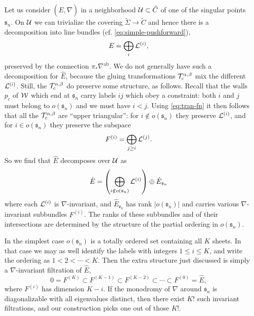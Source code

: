\documentclass[11pt,a4paper]{article}
\def\CL {{\cal L}}
\def\wnet {{\cal W}}
\def\CU{{\cal U}}
\def\CT{{\cal T}}
\def\ab{{\mathrm{ab}}}
\newcommand{\abs}[1]{\lvert#1\rvert}
\def\fs{\mathfrak{s}}
\def\CL {{\cal L}}
\def\wnet {{\cal W}}
\def\CU{{\cal U}}
\def\CT{{\cal T}}
\begin{document}
Let us consider
$({\hat E}, \nabla)$ in a neighborhood $\CU \subset \tilde C$ of one of the singular points
$\mathfrak{s}_n$.  On $\CU$ we can trivialize the covering $\tilde\Sigma \to \tilde C$ and hence
there is a decomposition into line bundles (cf. \eqref{eq:simple-pushforward}),
\begin{equation} \label{eq:e-simp-decomp}
E = \bigoplus_i \CL^{(i)},
\end{equation}
preserved by the connection $\pi_* \nabla^\ab$.
We do not generally have such a decomposition for
${\hat E}$, because the gluing transformations $\CT^{\alpha,\beta}_c$ mix the
different $\CL^{(i)}$.  Still, the $\CT^{\alpha,\beta}_c$ do preserve some structure, as follows.
Recall that the walls $p_c$ of $\wnet$ which end at $\fs_n$ carry labels $ij$ which
obey a constraint:  both $i$ and $j$ must belong to $o(\fs_n)$ and we must
have $i < j$.  Using \eqref{eq:tran-fn} it then follows that all the
$\CT^{\alpha,\beta}_c$ are ``upper triangular'':
for $i \notin o(\fs_n)$ they preserve $\CL^{(i)}$, and for $i \in o(\fs_n)$ they
preserve the subspace
\begin{equation}
 F^{(i)} = \bigoplus_{j \ge i} \CL^{(j)}.
\end{equation}
So we find that ${\hat E}$ decomposes
over $\CU$ as
\begin{equation} \label{eq:e-decomp}
{\hat E} = \left( \bigoplus_{i \notin o(\fs_n)} \CL^{(i)} \right) \oplus \hat E_{\fs_n}
\end{equation}
where each $\CL^{(i)}$ is $\nabla$-invariant, and
$\hat E_{\fs_n}$ has rank $\abs{o(\fs_n)}$ and
carries various $\nabla$-invariant subbundles $F^{(i)}$.  The ranks of these subbundles
and of their intersections are determined by the structure of the partial ordering in $o(\fs_n)$.

In the simplest case $o(\fs_n)$ is a totally ordered set containing all $K$ sheets.
In that case we may as well identify the labels with integers $1 \le i \le K$,
and write the ordering as $1 < 2 < \cdots < K$.  Then the
extra structure just discussed is simply a $\nabla$-invariant filtration of ${\hat E}$,
\begin{equation}
 0 = F^{(K)}  \subset F^{(K-1)} \subset F^{(K-2)} \subset \cdots \subset F^{(0)} = {\hat E},
\end{equation}
where $F^{(i)}$ has dimension $K-i$.  If the monodromy of $\nabla$ around $\fs_n$ is diagonalizable
with all eigenvalues distinct, then there exist $K!$ such invariant filtrations, and
our construction picks one out of those $K!$.
\end{document}
